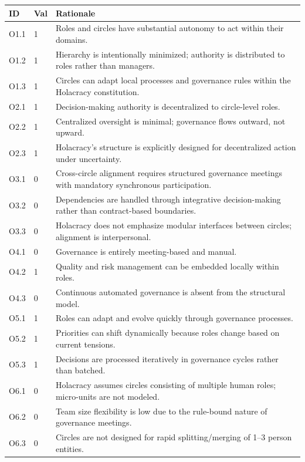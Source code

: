 \documentclass[11pt, a4paper, twocolumn]{article} %
\begin{document}
\begin{table}[h]
\centering
\begingroup\small
\setlength{\tabcolsep}{4pt}%
\begin{tabularx}{\linewidth}{llX}
\toprule
\textbf{ID} & \textbf{Val} & \textbf{Rationale} \\
\midrule
O1.1 & 1 &
Roles and circles have substantial autonomy to act within their domains. \\
O1.2 & 1 &
Hierarchy is intentionally minimized; authority is distributed to roles rather than managers. \\
O1.3 & 1 &
Circles can adapt local processes and governance rules within the Holacracy constitution. \\
\midrule
O2.1 & 1 &
Decision-making authority is decentralized to circle-level roles. \\
O2.2 & 1 &
Centralized oversight is minimal; governance flows outward, not upward. \\
O2.3 & 1 &
Holacracy’s structure is explicitly designed for decentralized action under uncertainty. \\
\midrule
O3.1 & 0 &
Cross-circle alignment requires structured governance meetings with mandatory synchronous participation. \\
O3.2 & 0 &
Dependencies are handled through integrative decision-making rather than contract-based boundaries. \\
O3.3 & 0 &
Holacracy does not emphasize modular interfaces between circles; alignment is interpersonal. \\
\midrule
O4.1 & 0 &
Governance is entirely meeting-based and manual. \\
O4.2 & 1 &
Quality and risk management can be embedded locally within roles. \\
O4.3 & 0 &
Continuous automated governance is absent from the structural model. \\
\midrule
O5.1 & 1 &
Roles can adapt and evolve quickly through governance processes. \\
O5.2 & 1 &
Priorities can shift dynamically because roles change based on current tensions. \\
O5.3 & 1 &
Decisions are processed iteratively in governance cycles rather than batched. \\
\midrule
O6.1 & 0 &
Holacracy assumes circles consisting of multiple human roles; micro-units are not modeled. \\
O6.2 & 0 &
Team size flexibility is low due to the rule-bound nature of governance meetings. \\
O6.3 & 0 &
Circles are not designed for rapid splitting/merging of 1--3 person entities. \\
\bottomrule
\end{tabularx}
\endgroup
\end{table}
\end{document}
